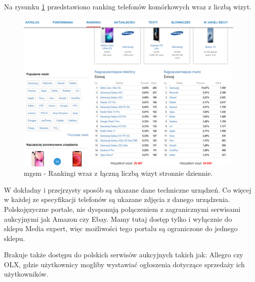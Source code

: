 Na rysunku \ref*{mgsm_2} przedstawiono ranking telefonów komórkowych wraz z liczbą wizyt.
\begin{figure}[H]
    \centering
    \includegraphics[scale=0.48]{img/mgsm/rankingsMgsm.png}
    \caption{mgsm - Rankingi wraz z łączną liczbą wizyt stronnie dziennie.}
    \label{mgsm_2}
\end{figure}
W dokładny i przejrzysty sposób są ukazane dane techniczne urządzeń. Co więcej w każdej ze specyfikacji telefonów są ukazane zdjęcia z danego urządzenia. Polskojęzyczne portale, nie dysponują połączeniem z zagranicznymi serwisami aukcyjnymi jak Amazon czy Ebay. Mamy tutaj dostęp tylko i wyłącznie do sklepu Media expert, więc możliwości tego portalu są ograniczone do jednego sklepu.

Brakuje także dostępu do polskich serwisów aukcyjnych takich jak: Allegro czy OLX, gdzie użytkownicy mogliby wystawiać ogłoszenia dotyczące sprzedaży ich użytkowników.

